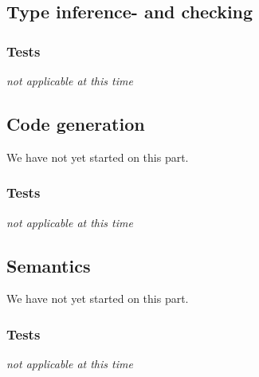\documentclass[11pt]{article}
\begin{document}
\subsection{Type inference- and checking}


\subsubsection{Tests}
{\it not applicable at this time}%

\subsection{Code generation}
We have not yet started on this part.

\subsubsection{Tests}%
{\it not applicable at this time}%

\subsection{Semantics}
We have not yet started on this part.

\subsubsection{Tests}
{\it not applicable at this time}%
\end{document}
